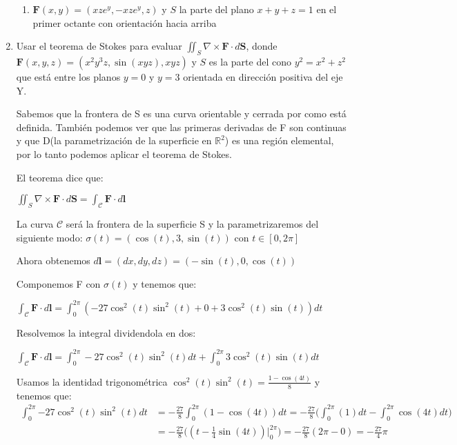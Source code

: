 \documentclass{article}
\begin{document}
\begin{enumerate}
{\begin{enumerate}
{			\color{azul}


            }

            \item{
            	$\mathbf{F} (x,y) = (xze^y,-xze^y,z)$ y $S$ la parte del plano $x + y+ z = 1$ en el primer octante con orientación hacia arriba

           \color{azul}

            }
            \end{enumerate}


        }

        \item {
            Usar el teorema de Stokes para evaluar $\iint_{S} \nabla \times \mathbf{F} \cdot d\mathbf{S}$, donde $\mathbf{F}(x,y,z) =(x^2y^3z,\sin(xyz),xyz)$ y $S$ es la parte del cono $y^2 = x^2 + z^2$ que está entre los planos $y = 0$ y $y = 3$ orientada en dirección positiva del eje Y.

            \color{azul}
            Sabemos que la frontera de S es una curva orientable y cerrada por
            como está definida. También podemos ver que las primeras derivadas
            de F son continuas y que D(la parametrización de la superficie en
            $\mathbb{R}^2$) es una región elemental, por lo tanto podemos
            aplicar el teorema de Stokes.

            El teorema dice que:

            $\iint_{S} \nabla \times \mathbf{F} \cdot d\mathbf{S} = \int_{\mathcal{C}} \mathbf{F} \cdot d\mathbf{l}$

            La curva $\mathcal{C}$ será la frontera de la superficie S y la parametrizaremos del siguiente modo: $\sigma(t) = (\cos(t), 3, \sin(t))$ con $t \in [0, 2\pi]$

            Ahora obtenemos $d\mathbf{l} = (dx, dy, dz) = (-\sin(t), 0, \cos(t))$

        Componemos F con $\sigma(t)$ y tenemos que:

        $\int_{\mathcal{C}} \mathbf{F} \cdot d\mathbf{l} = \int_{0}^{2\pi} (-27\cos^2(t)\sin^2(t) + 0 + 3\cos^2(t)\sin(t)) dt$

        Resolvemos la integral dividendola en dos:

         $\int_{\mathcal{C}} \mathbf{F} \cdot d\mathbf{l} = \int_{0}^{2\pi} -27\cos^2(t)\sin^2(t) dt +   \int_{0}^{2\pi}3\cos^2(t)\sin(t)dt$

         Usamos la identidad trigonométrica $\cos^2(t)\sin^2(t) = \frac{1 - \cos(4t)}{8}$ y tenemos que:
         \begin{align*}
                \int_{0}^{2\pi}{-27\cos^2(t)\sin^2(t)dt}
                &= -\frac{27}{8} \int_{0}^{2\pi}{(1 - \cos(4t)) dt}
                = -\frac{27}{8} \Big(\int_{0}^{2\pi}{(1)dt }  - \int_{0}^{2\pi}{\cos(4t)dt}\Big)\\[0.3cm]
                &= -\frac{27}{8}\Big((t - \frac{1}{4} \sin(4t))\Big |_{0}^{2\pi}\Big)
                = -\frac{27}{8} (2\pi - 0)
               	= -\frac{27}{4}\pi
            \end{align*}

}
\end{enumerate}
\end{document}
